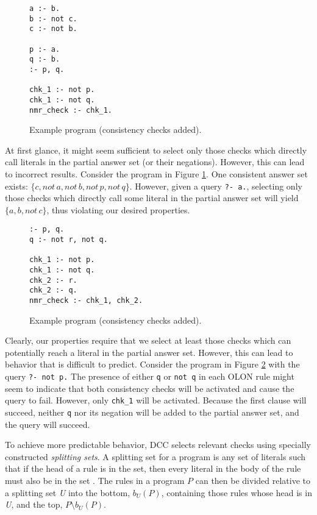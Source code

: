 \documentclass{new_tlp}
\begin{document}
\begin{figure}
\figrule
\begin{verbatim}
a :- b.
b :- not c.
c :- not b.

p :- a.
q :- b.
:- p, q.

chk_1 :- not p.
chk_1 :- not q.
nmr_check :- chk_1.
\end{verbatim}
\caption{Example program (consistency checks added).} \label{fig:example1}
\figrule
\end{figure}

At first glance, it might seem sufficient to select only those checks which 
directly call literals in the partial answer set (or their negations). However, 
this can lead to incorrect results. Consider the program in Figure 
\ref{fig:example1}. One consistent answer set exists:
$\{ c, not\,a, not\,b, not\,p, not\,q \}$.
However, given a query \texttt{?- a.}, selecting only those checks which
directly call some literal in the partial answer set will yield
$\{ a, b, not\,c \}$, thus violating our desired properties.

\begin{figure}
\figrule
\begin{verbatim}
:- p, q.
q :- not r, not q.

chk_1 :- not p.
chk_1 :- not q.
chk_2 :- r.
chk_2 :- q.
nmr_check :- chk_1, chk_2.
\end{verbatim}
\caption{Example program (consistency checks added).} \label{fig:example2}
\figrule
\end{figure}

Clearly, our properties require that we select at least those checks which can 
potentially reach a literal in the partial answer set. However, this can lead 
to behavior that is difficult to predict. Consider the program in Figure 
\ref{fig:example2} with the query \texttt{?- not p.} The presence of either
\texttt{q} or \texttt{not q} in each OLON rule might seem to indicate that both
consistency checks will be activated and cause the query to fail. However, only
\texttt{chk\_1} will be activated. Because the first clause will succeed,
neither \texttt{q} nor its negation will be added to the partial answer set,
and the query will succeed.

To achieve more predictable behavior, DCC selects relevant checks using 
specially constructed \textit{splitting sets}. A splitting set for a program is 
any set of literals such that if the head of a rule is in the set, then every 
literal in the body of the rule must also be in the set \cite{splitting}. The 
rules in a program $ P $ can then be divided relative to a splitting set 
\textit{U} into the bottom, $b_U(P)$, containing those rules whose head is in
\textit{U}, and the top, $P \setminus b_{U}(P)$.
\end{document}
